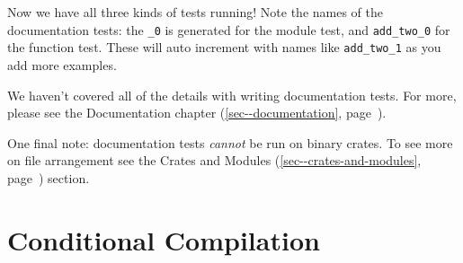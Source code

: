 \documentclass[a4paper,]{book}
\renewcommand*{\hyperref}[2][\ar]{%
  \def\ar{#2}%
  #2 (\autoref{#1}, page~\pageref{#1})}
\newenvironment{Shaded}{\begin{snugshade}}{\end{snugshade}}
\newcommand{\KeywordTok}[1]{\textcolor[rgb]{0.13,0.29,0.53}{\textbf{{#1}}}}
\newcommand{\NormalTok}[1]{{#1}}
\begin{document}
\begin{Shaded}
\end{Shaded}

Now we have all three kinds of tests running! Note the names of the
documentation tests: the \texttt{\_0} is generated for the module test,
and \texttt{add\_two\_0} for the function test. These will auto
increment with names like \texttt{add\_two\_1} as you add more examples.

We haven't covered all of the details with writing documentation tests.
For more, please see the \hyperref[sec--documentation]{Documentation
chapter}.

One final note: documentation tests \emph{cannot} be run on binary
crates. To see more on file arrangement see the
\hyperref[sec--crates-and-modules]{Crates and Modules} section.

\section{Conditional Compilation}\label{sec--conditional-compilation}
\end{document}

